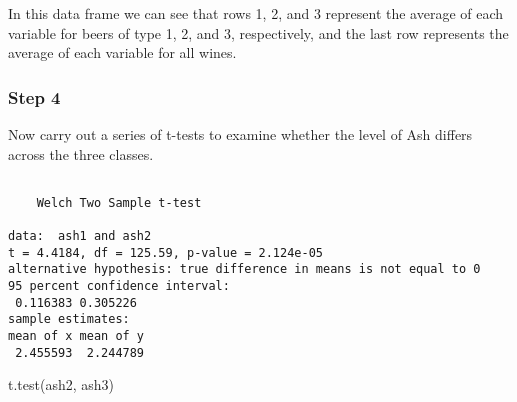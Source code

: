 \documentclass[
  letterpaper,
  DIV=11,
  numbers=noendperiod]{scrartcl}
\newenvironment{Shaded}{\begin{snugshade}}{\end{snugshade}}
\newcommand{\CommentTok}[1]{\textcolor[rgb]{0.37,0.37,0.37}{#1}}
\newcommand{\DecValTok}[1]{\textcolor[rgb]{0.68,0.00,0.00}{#1}}
\newcommand{\FunctionTok}[1]{\textcolor[rgb]{0.28,0.35,0.67}{#1}}
\newcommand{\NormalTok}[1]{\textcolor[rgb]{0.00,0.23,0.31}{#1}}
\newcommand{\OtherTok}[1]{\textcolor[rgb]{0.00,0.23,0.31}{#1}}
\newcommand{\SpecialCharTok}[1]{\textcolor[rgb]{0.37,0.37,0.37}{#1}}
\begin{document}
In this data frame we can see that rows 1, 2, and 3 represent the
average of each variable for beers of type 1, 2, and 3, respectively,
and the last row represents the average of each variable for all wines.

\hypertarget{step-4}{%
\subsubsection{Step 4}\label{step-4}}

Now carry out a series of t-tests to examine whether the level of Ash
differs across the three classes.

\begin{Shaded}
\end{Shaded}

\begin{verbatim}

    Welch Two Sample t-test

data:  ash1 and ash2
t = 4.4184, df = 125.59, p-value = 2.124e-05
alternative hypothesis: true difference in means is not equal to 0
95 percent confidence interval:
 0.116383 0.305226
sample estimates:
mean of x mean of y 
 2.455593  2.244789 
\end{verbatim}

\begin{Shaded}
\begin{Highlighting}[]
\FunctionTok{t.test}\NormalTok{(ash2, ash3)}
\end{Highlighting}
\end{Shaded}
\end{document}
